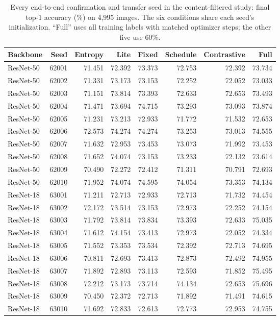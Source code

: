 \documentclass[10pt,a4paper,twocolumn]{article}
\begin{document}
\begin{table}[tbp]
\caption{Every end-to-end confirmation and transfer seed in the
content-filtered study: final top-1 accuracy (\%) on 4,995 images.
The six conditions share each seed's initialization. ``Full'' uses all
training labels with matched optimizer steps; the other five use 60\%.}
\label{tab:solid_seeds}
\centering\small
\begin{tabular*}{\textwidth}{@{\extracolsep{\fill}}lrrrrrrr@{}}
\toprule
Backbone & Seed & Entropy & Lite & Fixed & Schedule & Contrastive & Full \\
\midrule
ResNet-50 & 62001 & 71.451 & 72.392 & 73.373 & 72.753 & 72.392 & 73.734 \\
ResNet-50 & 62002 & 71.331 & 73.173 & 73.153 & 72.252 & 72.052 & 73.033 \\
ResNet-50 & 62003 & 71.151 & 73.814 & 73.393 & 72.633 & 72.653 & 73.493 \\
ResNet-50 & 62004 & 71.471 & 73.694 & 74.715 & 73.293 & 73.093 & 73.874 \\
ResNet-50 & 62005 & 71.231 & 73.213 & 72.933 & 71.772 & 71.532 & 72.653 \\
ResNet-50 & 62006 & 72.573 & 74.274 & 74.274 & 73.253 & 73.013 & 74.555 \\
ResNet-50 & 62007 & 71.632 & 72.953 & 73.453 & 73.073 & 71.992 & 73.453 \\
ResNet-50 & 62008 & 71.652 & 74.074 & 73.153 & 73.233 & 72.132 & 73.614 \\
ResNet-50 & 62009 & 70.490 & 72.272 & 72.412 & 71.311 & 70.791 & 72.693 \\
ResNet-50 & 62010 & 71.952 & 74.074 & 74.595 & 74.054 & 73.353 & 74.134 \\
\midrule
ResNet-18 & 63001 & 71.211 & 72.713 & 72.933 & 72.713 & 71.732 & 74.454 \\
ResNet-18 & 63002 & 72.172 & 73.514 & 73.153 & 72.973 & 72.252 & 74.154 \\
ResNet-18 & 63003 & 71.792 & 73.814 & 73.834 & 73.393 & 72.633 & 75.035 \\
ResNet-18 & 63004 & 71.612 & 74.154 & 73.413 & 72.973 & 72.052 & 74.334 \\
ResNet-18 & 63005 & 71.552 & 73.353 & 73.534 & 72.392 & 72.713 & 74.695 \\
ResNet-18 & 63006 & 70.811 & 72.693 & 73.413 & 72.873 & 72.492 & 74.955 \\
ResNet-18 & 63007 & 71.892 & 72.893 & 73.113 & 72.593 & 71.852 & 75.495 \\
ResNet-18 & 63008 & 72.212 & 73.173 & 73.714 & 74.134 & 72.653 & 75.696 \\
ResNet-18 & 63009 & 70.450 & 72.372 & 72.713 & 71.892 & 71.491 & 74.615 \\
ResNet-18 & 63010 & 71.692 & 72.833 & 72.613 & 72.773 & 72.953 & 74.755 \\
\bottomrule
\end{tabular*}
\end{table}
\end{document}
